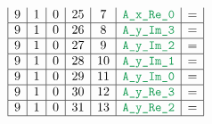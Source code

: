 \begin{figure}[h!]
\begin{adjustwidth}{-2cm}{-2cm}
{\[\begin{array}{|c|c|c|c|c|c|c|}
                    9                      & 1                                       & 0                                         & 25                     & 7                   & \locAXReZero  & =                                                                                                                                                                 \\ \hline
                    9                      & 1                                       & 0                                         & 26                     & 8                   & \locAYImThree & =                                                                                                                                                                 \\ \hline
                    9                      & 1                                       & 0                                         & 27                     & 9                   & \locAYImTwo   & =                                                                                                                                                                 \\ \hline
                    9                      & 1                                       & 0                                         & 28                     & 10                  & \locAYImOne   & =                                                                                                                                                                 \\ \hline
                    9                      & 1                                       & 0                                         & 29                     & 11                  & \locAYImZero  & =                                                                                                                                                                 \\ \hline
                    9                      & 1                                       & 0                                         & 30                     & 12                  & \locAYReThree & =                                                                                                                                                                 \\ \hline
                    9                      & 1                                       & 0                                         & 31                     & 13                  & \locAYReTwo   & =                                                                                                                                                                 \\ \hline

\end{array}\]}
\end{adjustwidth}
\end{figure}
